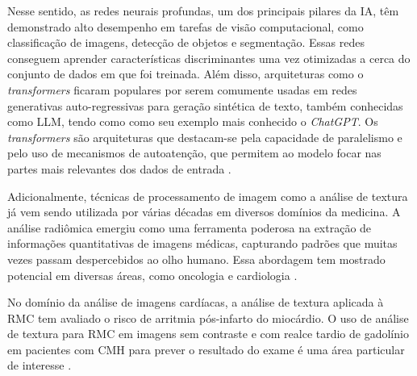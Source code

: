 Nesse sentido, as redes neurais profundas, um dos principais pilares da \gls{IA}, têm demonstrado alto desempenho em tarefas de visão computacional, como classificação de imagens, detecção de objetos e segmentação. Essas redes conseguem aprender características discriminantes uma vez otimizadas a cerca do conjunto de dados em que foi treinada. Além disso, arquiteturas como o \textit{transformers} ficaram populares por serem comumente usadas em redes generativas auto-regressivas para geração sintética de texto, também conhecidas como \gls{LLM}, tendo como como seu exemplo mais conhecido o \textit{ChatGPT}. Os \textit{transformers} são arquiteturas que destacam-se pela capacidade de paralelismo e pelo uso de mecanismos de autoatenção, que permitem ao modelo focar nas partes mais relevantes dos dados de entrada \cite{russell2020artificial}.

Adicionalmente, técnicas de processamento de imagem como a análise de textura já vem sendo utilizada por várias décadas em diversos domínios da medicina. A análise radiômica emergiu como uma ferramenta poderosa na extração de informações quantitativas de imagens médicas, capturando padrões que muitas vezes passam despercebidos ao olho humano. Essa abordagem tem mostrado potencial em diversas áreas, como oncologia e cardiologia \cite{schofieldTextureAnalysisCardiovascular2019a}.



No domínio da análise de imagens cardíacas, a análise de textura aplicada à \gls{RMC} tem avaliado o risco de arritmia pós-infarto do miocárdio. O uso de análise de textura para \gls{RMC} em imagens sem contraste e com realce tardio de gadolínio em pacientes com \gls{CMH} para prever o resultado do exame é uma área particular de interesse \cite{schofieldTextureAnalysisCardiovascular2019a}.

